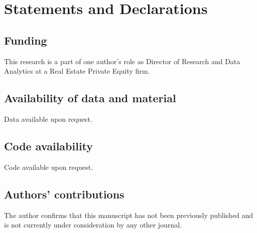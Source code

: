 \pagebreak
%
\section*{Statements and Declarations}
\subsection{Funding}
This research is a part of one author's role as Director of Research and Data Analytics at a Real Estate Private Equity firm. 

\subsection{Availability of data and material}
Data available upon request.

\subsection{Code availability}
Code available upon request.

\subsection{Authors' contributions}
The author confirms that this manuscript has not been previously published and is not currently under consideration by any other journal.




%
%
\pagebreak
 



